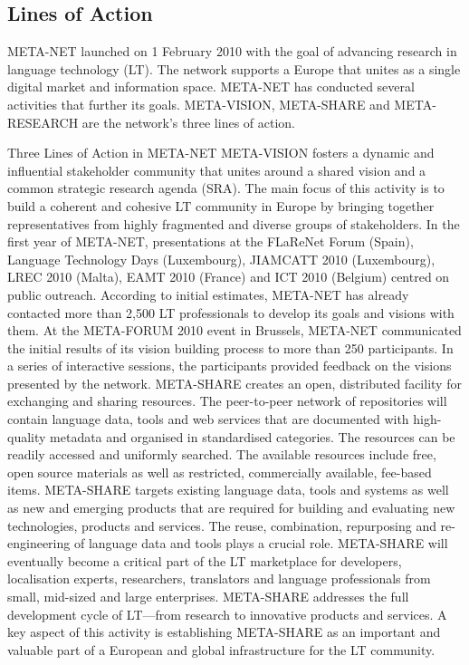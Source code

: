 \documentclass[]{../metanetpaper}
\begin{document}
 	\subsection{Lines of Action}
 META-NET launched on 1 February 2010 with the goal of advancing research in language technology (LT). The network supports a Europe that unites as a single digital market and information space. META-NET has conducted several activities that further its goals. META-VISION, META-SHARE and META-RESEARCH are the network’s three lines of action.

Three Lines of Action in META-NET
META-VISION fosters a dynamic and influential stakeholder community that unites around a shared vision and a common strategic research agenda (SRA). The main focus of this activity is to build a coherent and cohesive LT community in Europe by bringing together representatives from highly fragmented and diverse groups of stakeholders. In the first year of META-NET, presentations at the FLaReNet Forum (Spain), Language Technology Days (Luxembourg), JIAMCATT 2010 (Luxembourg), LREC 2010 (Malta), EAMT 2010 (France) and ICT 2010 (Belgium) centred on public outreach. According to initial estimates, META-NET has already contacted more than 2,500 LT professionals to develop its goals and visions with them. At the META-FORUM 2010 event in Brussels, META-NET communicated the initial results of its vision building process to more than 250 participants. In a series of interactive sessions, the participants provided feedback on the visions presented by the network. 
META-SHARE creates an open, distributed facility for exchanging and sharing resources. The peer-to-peer network of repositories will contain language data, tools and web services that are documented with high-quality metadata and organised in standardised categories. The resources can be readily accessed and uniformly searched. The available resources include free, open source materials as well as restricted, commercially available, fee-based items. META-SHARE targets existing language data, tools and systems as well as new and emerging products that are required for building and evaluating new technologies, products and services. The reuse, combination, repurposing and re-engineering of language data and tools plays a crucial role. META-SHARE will eventually become a critical part of the LT marketplace for developers, localisation experts, researchers, translators and language professionals from small, mid-sized and large enterprises. META-SHARE addresses the full development cycle of LT—from research to innovative products and services. A key aspect of this activity is establishing META-SHARE as an important and valuable part of a European and global infrastructure for the LT community. 
\end{document}
